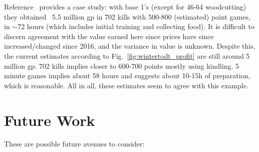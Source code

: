 		Reference~\cite{HereticAcinonyx:wintertodt_99_value} provides a case study: with base 1's (except for 46-64 woodcutting) they obtained ~5.5 million gp in 702 kills with 500-800 (estimated) point games, in $\sim$72 hours (which includes initial training and collecting food). 
		It is difficult to discern agreement with the value earned here since prices have since increased/changed since 2016, and the variance in value is unknown. Despite this, the current estimates according to Fig.~\ref{fig:wintertodt_profit} are still around 5 million gp. 702 kills implies closer to 600-700 points mostly using kindling. 5 minute games implies about 58 hours and suggests about 10-15h of preparation, which is reasonable. All in all, these estimates seem to agree with this example.
	
	\section{Future Work}\label{sec:wintertodt_future_work}
		These are possible future avenues to consider:
